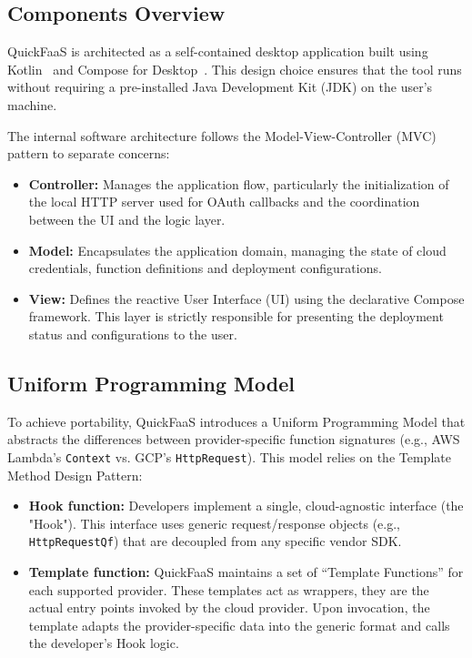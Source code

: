 \subsection{Components Overview}
QuickFaaS is architected as a self-contained desktop application built using Kotlin~\cite{kotlin_lang} and Compose for Desktop~\cite{compose_multiplatform}. This design choice ensures that the tool runs without requiring a pre-installed Java Development Kit (JDK) on the user's machine.

The internal software architecture follows the Model-View-Controller (MVC) pattern to separate concerns:
\begin{itemize}
	\item \textbf{Controller:} Manages the application flow, particularly the initialization of the local HTTP server used for OAuth callbacks and the coordination between the UI and the logic layer.
	\item \textbf{Model:} Encapsulates the application domain, managing the state of cloud credentials, function definitions and deployment configurations.
	\item \textbf{View:} Defines the reactive User Interface (UI) using the declarative Compose framework. This layer is strictly responsible for presenting the deployment status and configurations to the user.
\end{itemize}

\subsection{Uniform Programming Model}
To achieve portability, QuickFaaS introduces a Uniform Programming Model that abstracts the differences between provider-specific function signatures (e.g., AWS Lambda's \texttt{Context} vs. GCP's \texttt{HttpRequest}). This model relies on the Template Method Design Pattern:

\begin{itemize}
	\item \textbf{Hook function:} Developers implement a single, cloud-agnostic interface (the "Hook"). This interface uses generic request/response objects (e.g., \texttt{HttpRequestQf}) that are decoupled from any specific vendor SDK.
	\item \textbf{Template function:} QuickFaaS maintains a set of ``Template Functions'' for each supported provider. These templates act as wrappers, they are the actual entry points invoked by the cloud provider. Upon invocation, the template adapts the provider-specific data into the generic format and calls the developer's Hook logic.
\end{itemize}

